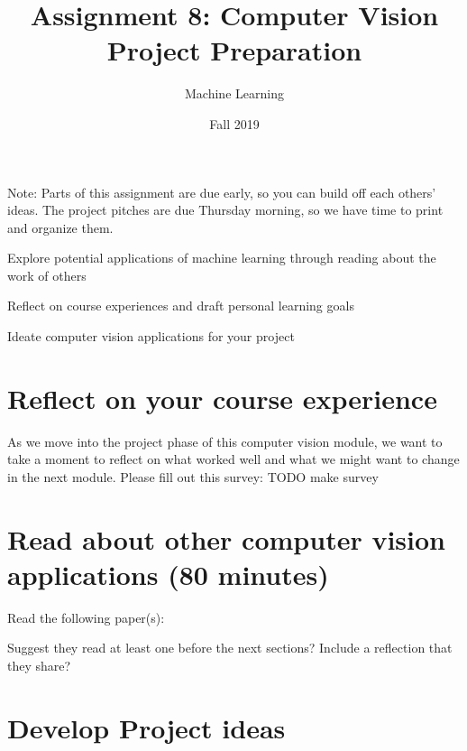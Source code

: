 \documentclass[assignment08_Solutions]{subfiles}
\title{Assignment 8: Computer Vision Project Preparation}
\author{Machine Learning}
\date{Fall 2019}
\begin{document}
\maketitle
\thispagestyle{firstpage}

Note: Parts of this assignment are due early, so you can build off each others' ideas. The project pitches are due Thursday morning, so we have time to print and organize them.
\vspace{2em}



\begin{learningobjectives}
\bi
\item Explore potential applications of machine learning through reading about the work of others
\item Reflect on course experiences and draft personal learning goals
\item Ideate computer vision applications for your project
\ei
\end{learningobjectives}


\section{Reflect on your course experience}

\begin{exercise}[(20 minutes)]
As we move into the project phase of this computer vision module, we want to take a moment to reflect on what worked well and what we might want to change in the next module. Please fill out this survey:
TODO make survey
\end{exercise}
 


\section{Read about other computer vision applications (80 minutes)}

\begin{exercise}[(80 minutes)]
Read the following paper(s):

Suggest they read at least one before the next sections?
Include a reflection that they share?
\end{exercise}


\section{Develop Project ideas}
\end{document}
